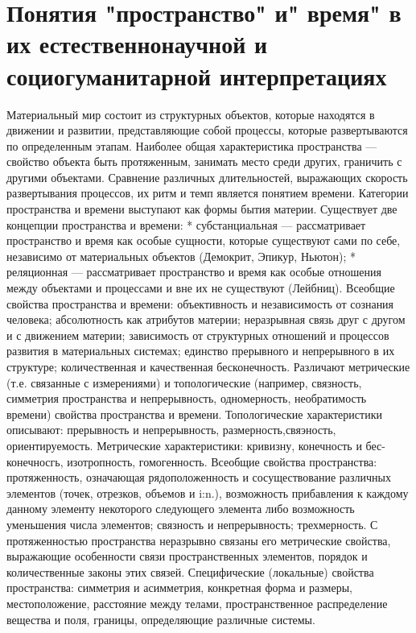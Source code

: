 \documentclass[12pt]{article}
\begin{document}
\section{Понятия "пространство" и" время" в их естественнонаучной и социогуманитарной интерпретациях}
Материальный мир состоит из структурных объектов, которые находятся в движении и развитии,
представляющие собой процессы, которые развертываются по определенным этапам.
Наиболее общая характеристика пространства — свойство объекта быть протяженным, занимать место среди
других, граничить с другими объектами.
Сравнение различных длительностей, выражающих скорость развертывания процессов, их ритм и темп
является понятием времени.
Категории пространства и времени выступают как формы бытия материи. Существует две концепции
пространства и времени:
* субстанциальная — рассматривает пространство и время как особые сущности, которые существуют сами
по себе, независимо от материальных объектов (Демокрит, Эпикур, Ньютон);
* реляционная — рассматривает пространство и время как особые отношения между объектами и процессами
и вне их не существуют (Лейбниц).
Всеобщие свойства пространства и времени: объективность и независимость от сознания человека;
абсолютность как атрибутов материи; неразрывная связь друг с другом и с движением материи; зависимость от
структурных отношений и процессов развития в материальных системах; единство прерывного и непрерывного
в их структуре; количественная и качественная бесконечность.
Различают метрические (т.е. связанные с измерениями) и топологические (например, связность, симметрия
пространства и непрерывность, одномерность, необратимость времени) свойства пространства и времени.
Топологические характеристики описывают: прерывность и непрерывность, размерность,свяэность,
ориентируемость.
Метрические характеристики: кривизну, конечность и бес-конечносгь, изотропность, гомогенность.
Всеобщие свойства пространства: протяженность, означающая рядоположенность и сосуществование
различных элементов (точек, отрезков, объемов и i:n.), возможность прибавления к каждому данному элементу
некоторого следующего элемента либо возможность уменьшения числа элементов; связность и непрерывность;
трехмерность.
С протяженностью пространства неразрывно связаны его метрические свойства, выражающие особенности
связи пространственных элементов, порядок и количественные законы этих связей.
Специфические (локальные) свойства пространства: симметрия и асимметрия, конкретная форма и размеры,
местоположение, расстояние между телами, пространственное распределение вещества и поля, границы,
определяющие различные системы.
\end{document}
